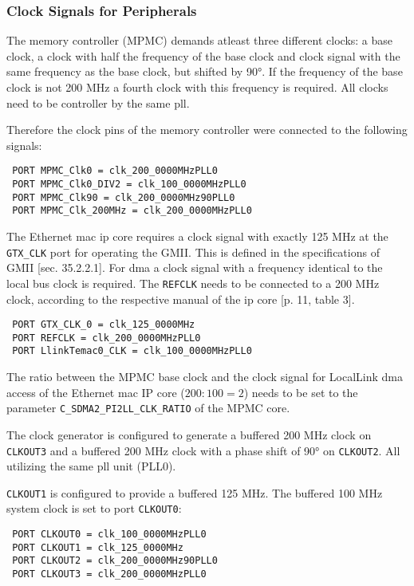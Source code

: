 \subsubsection{Clock Signals for Peripherals}

The memory controller (MPMC) demands atleast three different clocks: a base clock, a clock with half the frequency of the base clock and clock signal with the same frequency as the base clock, but shifted by 90°. If the frequency of the base clock is not 200 MHz a fourth clock with this frequency is required. All clocks need to be controller by the same \gls{pll}.

Therefore the clock pins of the memory controller were connected to the following signals:

\begin{verbatim}
 PORT MPMC_Clk0 = clk_200_0000MHzPLL0
 PORT MPMC_Clk0_DIV2 = clk_100_0000MHzPLL0
 PORT MPMC_Clk90 = clk_200_0000MHz90PLL0
 PORT MPMC_Clk_200MHz = clk_200_0000MHzPLL0
\end{verbatim}

The Ethernet \gls{mac} \gls{ip} core requires a clock signal with exactly 125 MHz at the \texttt{GTX\_CLK} port for operating the GMII. This is defined in the specifications of GMII \cite{ieee802_3}[sec. 35.2.2.1]. For \gls{dma} a clock signal with a frequency identical to the local bus clock is required. The \texttt{REFCLK} needs to be connected to a 200 MHz clock, according to the respective manual of the \gls{ip} core \cite{xps_ll_temac}[p. 11, table 3].

\begin{verbatim}
 PORT GTX_CLK_0 = clk_125_0000MHz
 PORT REFCLK = clk_200_0000MHzPLL0
 PORT LlinkTemac0_CLK = clk_100_0000MHzPLL0
\end{verbatim}

The ratio between the MPMC base clock and the clock signal for LocalLink \gls{dma} access of the Ethernet \gls{mac} IP core ($200:100 = 2$) needs to be set to the parameter \texttt{C\_SDMA2\_PI2LL\_CLK\_RATIO} of the MPMC core.

The clock generator is configured to generate a buffered 200 MHz clock on \texttt{CLKOUT3} and a buffered 200 MHz clock with a phase shift of 90° on \texttt{CLKOUT2}. All utilizing the same \gls{pll} unit (PLL0).

\texttt{CLKOUT1} is configured to provide a buffered 125 MHz. The buffered 100 MHz system clock is set to port \texttt{CLKOUT0}:

\begin{verbatim}
 PORT CLKOUT0 = clk_100_0000MHzPLL0
 PORT CLKOUT1 = clk_125_0000MHz
 PORT CLKOUT2 = clk_200_0000MHz90PLL0
 PORT CLKOUT3 = clk_200_0000MHzPLL0
\end{verbatim}


